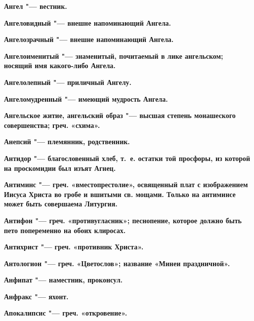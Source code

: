 \begin{mymulticols}{2}
\bfseries Ангел\normalfont{} "--- вестник. 




\bfseries Ангеловидный\normalfont{} "--- внешне напоминающий Ангела. 




\bfseries Ангелозрачный\normalfont{} "--- внешне напоминающий Ангела. 




\bfseries Ангелоименитый\normalfont{} "--- знаменитый, почитаемый в лике ангельском; носящий имя какого-либо Ангела. 




\bfseries Ангелолепный\normalfont{} "--- приличный Ангелу. 




\bfseries Ангеломудренный\normalfont{} "--- имеющий мудрость Ангела. 




\bfseries Ангельское житие, ангельский образ\normalfont{} "--- высшая степень монашеского совершенства; греч. «схима». 




\bfseries Анепсий\normalfont{} "--- племянник, родственник. 




\bfseries Антидор\normalfont{} "--- благословенный хлеб, т.~е. остатки той просфоры, из которой на проскомидии был изъят Агнец. 




\bfseries Антиминс\normalfont{} "--- греч. «вместопрестолие», освященный плат с изображением Иисуса Христа во гробе и вшитыми св. мощами. Только на антиминсе может быть совершаема Литургия. 




\bfseries Антифон\normalfont{} "--- греч. «противугласник»; песнопение, которое должно быть пето попеременно на обоих клиросах. 




\bfseries Антихрист\normalfont{} "--- греч. «противник Христа». 




\bfseries Антологион\normalfont{} "--- греч. «Цветослов»; название «Минеи праздничной». 




\bfseries Анфипат\normalfont{} "--- наместник, проконсул. 




\bfseries Анфракс\normalfont{} "--- яхонт. 




\bfseries Апокалипсис\normalfont{} "--- греч. «откровение». 





\end{mymulticols}
